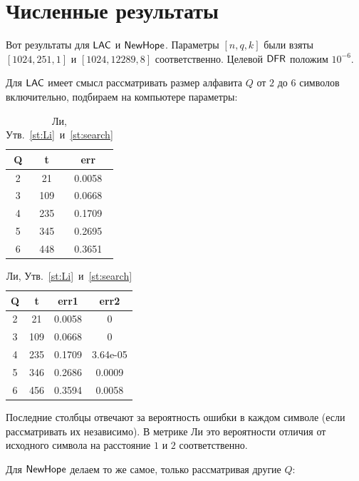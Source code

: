 \section{Численные результаты}
\label{sec:Chapter6} 

Вот результаты для $\mathsf{LAC}$ и $\mathsf{NewHope}$. Параметры $[n, q, k]$ были взяты $[1024, 251, 1]$ и $[1024, 12289, 8]$ соответственно. Целевой $\mathsf{DFR}$ положим $10^{-6}$.

Для $\mathsf{LAC}$ имеет смысл рассматривать размер алфавита $Q$ от $2$ до $6$ символов включительно, подбираем на компьютере параметры:

\begin{table}[h]
	\centering
	\begin{minipage}{0.48\textwidth}
		\caption{Хэмминг, Утв.~\ref{st:Ham}~и~\ref{st:search}}
		\centering
		\begin{tabular}{|c|c|c|}
			\hline Q & t & err \\ \hline
			2 & 21 & 0.0058 \\ \hline
			3 & 109 & 0.0668 \\ \hline
			4 & 235 & 0.1709 \\ \hline
			5 & 345 & 0.2695 \\ \hline
			6 & 448 & 0.3651 \\ \hline
		\end{tabular}
	\end{minipage}
	\begin{minipage}{0.48\textwidth}
		\caption{Ли, Утв.~\ref{st:Li}~и~\ref{st:search}}
		\centering
		\begin{tabular}{|c|c|c|c|}
			\hline Q & t & err1 & err2 \\ \hline
			2 & 21 & 0.0058 & 0 \\ \hline
			3 & 109 & 0.0668 & 0 \\ \hline
			4 & 235 & 0.1709 & 3.64e-05 \\ \hline
			5 & 346 & 0.2686 & 0.0009 \\ \hline
			6 & 456 & 0.3594 & 0.0058 \\ \hline
		\end{tabular}
	\end{minipage}
\end{table}

Последние столбцы отвечают за вероятность ошибки в каждом символе (если рассматривать их независимо). В метрике Ли это вероятности отличия от исходного символа на расстояние $1$ и $2$ соответственно.

Для $\mathsf{NewHope}$ делаем то же самое, только рассматривая другие $Q$:

